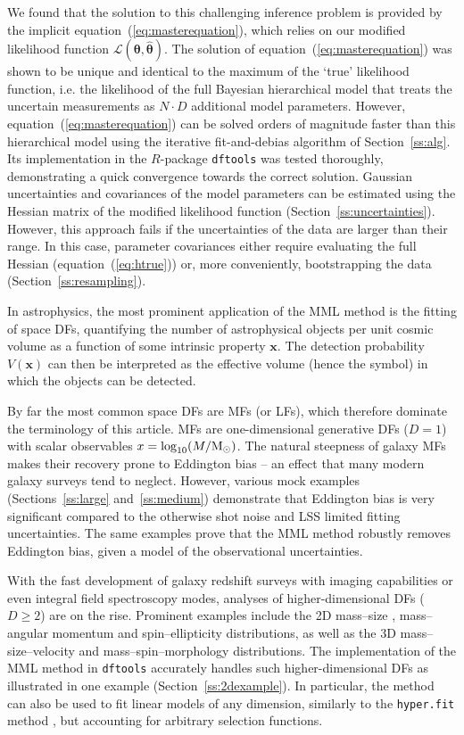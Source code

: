 \documentclass[a4paper,fleqn,usenatbib]{mnras}
\newcommand{\msun}{{\rm M}_{\odot}}
\newcommand{\dftools}{\texttt{dftools}\xspace}
\newcommand{\hyperfit}{\texttt{hyper.fit}\xspace}
\newcommand{\veff}{V}%
\renewcommand{\L}{\mathcal{L}}
\newcommand{\x}{\mathbf{x}}
\newcommand{\eq}[1]{equation~(\ref{eq:#1})}
\renewcommand{\ss}[1]{Section~\ref{ss:#1}}
\newcommand{\ie}{i.e.\xspace}
\newcommand{\para}{{\bm{\theta}}}
\begin{document}
We found that the solution to this challenging inference problem is provided by the implicit \eq{masterequation}, which relies on our modified likelihood function $\L(\para,\hat\para)$. The solution of \eq{masterequation} was shown to be unique and identical to the maximum of the `true' likelihood function, \ie the likelihood of the full Bayesian hierarchical model that treats the uncertain measurements as $N\cdot D$ additional model parameters. However, \eq{masterequation} can be solved orders of magnitude faster than this hierarchical model using the iterative fit-and-debias algorithm of \ss{alg}. Its implementation in the $R$-package \dftools was tested thoroughly, demonstrating a quick convergence towards the correct solution. Gaussian uncertainties and covariances of the model parameters can be estimated using the Hessian matrix of the modified likelihood function (\ss{uncertainties}). However, this approach fails if the uncertainties of the data are larger than their range. In this case, parameter covariances either require evaluating the full Hessian (\eq{htrue}) or, more conveniently, bootstrapping the data (\ss{resampling}).

In astrophysics, the most prominent application of the MML method is the fitting of space DFs, quantifying the number of astrophysical objects per unit cosmic volume as a function of some intrinsic property $\x$. The detection probability $\veff(\x)$ can then be interpreted as the effective volume (hence the symbol) in which the objects can be detected.

By far the most common space DFs are MFs (or LFs), which therefore dominate the terminology of this article. MFs are one-dimensional generative DFs ($D=1$) with scalar observables $x=\log_{10}(M/\msun)$. The natural steepness of galaxy MFs makes their recovery prone to Eddington bias -- an effect that many modern galaxy surveys tend to neglect. However, various mock examples (Sections~\ref{ss:large} and\ \ref{ss:medium}) demonstrate that Eddington bias is very significant compared to the otherwise shot noise and LSS limited fitting uncertainties. The same examples prove that the MML method robustly removes Eddington bias, given a model of the observational uncertainties.

With the fast development of galaxy redshift surveys with imaging capabilities or even integral field spectroscopy modes, analyses of higher-dimensional DFs ($D\geq2$) are on the rise. Prominent examples include the 2D mass--size \citep{Lange2015}, mass--angular momentum \citep{Romanowsky2012} and spin--ellipticity \citep{Emsellem2011} distributions, as well as the 3D mass--size--velocity \citep{Koda2000} and mass--spin--morphology \citep{Obreschkow2014} distributions. The implementation of the MML method in \dftools accurately handles such higher-dimensional DFs as illustrated in one example (\ss{2dexample}). In particular, the method can also be used to fit linear models of any dimension, similarly to the \hyperfit method \citep{Robotham2015}, but accounting for arbitrary selection functions.
\end{document}
